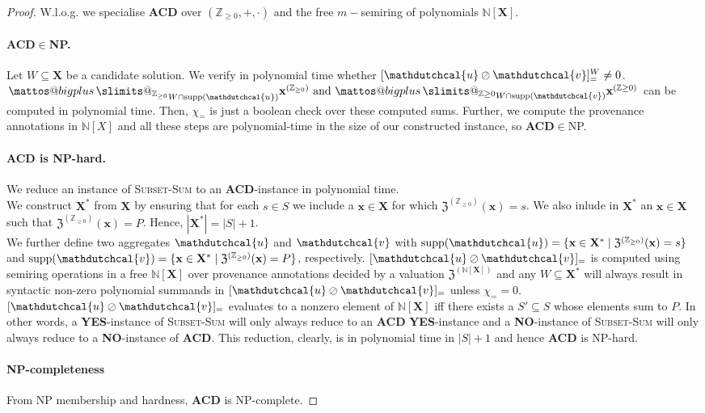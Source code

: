 \documentclass[10pt,a4paper]{scrartcl}
\makeatletter
\theoremstyle{definition}
\theoremstyle{remark}
\newcommand{\bigplus}{%
  \DOTSB\mathop{\mathpalette\mattos@bigplus\relax}\slimits@
}
\newcommand\mattos@bigplus[2]{%
  \vcenter{\hbox{%
    \sbox\z@{$#1\sum$}%
    \resizebox{!}{0.9\dimexpr\ht\z@+\dp\z@}{\raisebox{\depth}{$\m@th#1+$}}%
  }}%
  \vphantom{\sum}%
}
\makeatother
\begin{document}
\begin{proof}
W.l.o.g. we specialise \textbf{ACD} over $(\mathbb{Z}_{\geq 0},+,\cdot)$ and the free $m-$semiring of polynomials 
$\mathbb{N}[\mathbf{X}]$.
\paragraph{\textbf{ACD}$\in$NP.}
Let $W\subseteq\mathbf{X}$ be a candidate solution. We verify in polynomial time whether 
  $[\mathdutchcal{u} \oslash \mathdutchcal{v}]_=^W\neq0$.\\
${\bigplus_{\mathbb{Z}_{\geq 0}}}_{W\cap\mathrm{supp}(\mathdutchcal{u})} \mathbf{x}^{(\mathbb{Z}_{\geq 0})}\text{ and }{\bigplus_{\mathbb{Z}{\geq 0}}}_{W\cap\mathrm{supp}(\mathdutchcal{v})} \mathbf{x}^{(\mathbb{Z}{\geq 0})}$ can be computed in polynomial time.
Then, $\chi_=$ is just a boolean check over these computed sums. 
Further, we compute the provenance annotations in $\mathbb{N}[X]$ and all these steps 
are polynomial-time in the size of our constructed instance, so \textbf{ACD}$\in$NP.
\paragraph{ACD is NP-hard.}
We reduce an instance of \textsc{Subset-Sum} to an \textbf{ACD}-instance in polynomial time.\\
We construct $\mathbf{X}^*$ from $\mathbf{X}$ by ensuring that for each $s\in S$ we include a $\mathbf{x}\in\mathbf{X}$ for which 
  $\mathfrak{Z}^{(\mathbb{Z}_{\geq 0})}(\mathbf{x})=s$. We also inlude in $\mathbf{X}^*$ an $\mathbf{x}\in\mathbf{X}$ such that 
  $\mathfrak{Z}^{(\mathbb{Z}_{\geq 0})}(\mathbf{x})=P$. Hence, $|\mathbf{X}^*|=|S|+1$.\\
  We further define two aggregates $\mathdutchcal{u}$ and $\mathdutchcal{v}$ with $\mathrm{supp}(\mathdutchcal{u})=\{\mathbf{x}\in\mathbf{X}^*\mid\mathfrak{Z}^{(\mathbb{Z}_{\geq 0})}(\mathbf{x})=s\}$ and $\mathrm{supp}(\mathdutchcal{v})=\{\mathbf{x}\in\mathbf{X}^*\mid\mathfrak{Z}^{(\mathbb{Z}_{\geq 0})}(\mathbf{x})=P\}$, respectively.
  $[\mathdutchcal{u}\oslash\mathdutchcal{v}]_=$ is computed using semiring 
  operations in a free $\mathbb{N}[\mathbf{X}]$ over provenance 
  annotations decided by a valuation $\mathfrak{Z}^{(\mathbb{N}[\mathbf{X}])}$ 
  and any $W\subseteq\mathbf{X}^*$ will always result in syntactic 
  non-zero polynomial summands in  $[\mathdutchcal{u}\oslash\mathdutchcal{v}]_=$  
  unless $\chi_==0$. $[\mathdutchcal{u}\oslash\mathdutchcal{v}]_=$
evaluates to a nonzero element of $\mathbb{N}[\mathbf{X}]$
iff there exists a $S'\subseteq S$ whose elements sum to $P$.
  In other words, a \textbf{YES}-instance of \textsc{Subset-Sum} will only always reduce to an \textbf{ACD} \textbf{YES}-instance and a \textbf{NO}-instance 
  of \textsc{Subset-Sum} will only always reduce to a \textbf{NO}-instance of \textbf{ACD}. This reduction, clearly, is in polynomial time in $|S|+1$ and hence 
  \textbf{ACD} is NP-hard.
\paragraph{NP-completeness}
From NP membership and hardness, \textbf{ACD} is NP-complete.
\end{proof}
\end{document}
